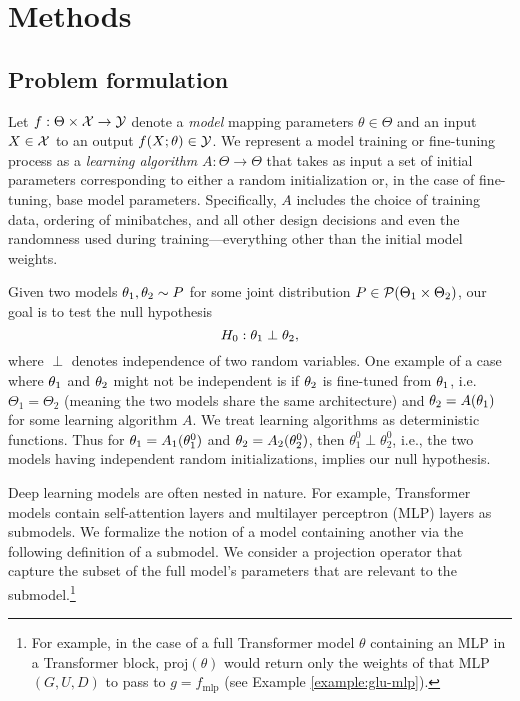 \section{Methods}

\subsection{Problem formulation}\label{sec:basics}

Let $f : \Theta \times \mathcal{X} \to \mathcal{Y}$ denote a \textit{model} mapping parameters $\theta \in \Theta$ and an input $X \in \mathcal{X}$ to an output $f(X ; \theta) \in \mathcal{Y}$. 
We represent a model training or fine-tuning process as a \textit{learning algorithm} $A: \Theta \to \Theta$ that takes as input a set of initial parameters corresponding to either a random initialization or, in the case of fine-tuning, base model parameters. 
Specifically, $A$ includes the choice of training data, ordering of minibatches, and all other design decisions and even the randomness used during training---everything other than the initial model weights. 

Given two models $\theta_1,\theta_2 \sim P$ for some joint distribution $P \in \mathcal{P}(\Theta_1 \times \Theta_2)$,
our goal is to test the null hypothesis
\begin{equation}
    H_0: \theta_1 \perp \theta_2,
\end{equation}
where $\perp$ denotes independence of two random variables.
One example of a case where $\theta_1$ and $\theta_2$ might not be independent is if $\theta_2$ is fine-tuned from $\theta_1$, i.e. $\Theta_1 = \Theta_2$ (meaning the two models share the same architecture) and
$\theta_2 = A(\theta_1)$ for some learning algorithm $A$.
We treat learning algorithms as deterministic functions.
Thus for $\theta_1 = A_1(\theta_1^0)$ and $\theta_2 = A_2(\theta_2^0)$, then $\theta_1^0 \perp \theta_2^0$, i.e., the two models having independent random initializations, implies our null hypothesis.

Deep learning models are often nested in nature. 
For example, Transformer models contain self-attention layers and multilayer perceptron (MLP) layers as submodels.
We formalize the notion of a model containing another via the following definition of a submodel. We consider a projection operator that capture the subset of the full model's parameters that are relevant to the submodel.\footnote{For example, in the case of a full Transformer model $\theta$ containing an MLP in a Transformer block, 
$\text{proj}(\theta)$ would return only the weights of that MLP $(G,U,D)$ to pass to $g = f_\text{mlp}$ (see Example \ref{example:glu-mlp}).}

